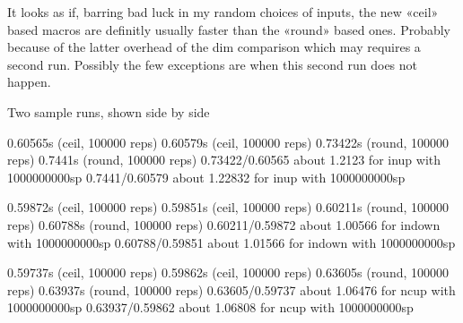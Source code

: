 

%







\bye

It looks as if, barring bad luck in my random choices of inputs,
the new «ceil» based macros are definitly usually faster than
the «round» based ones. Probably because of the latter
overhead of the dim comparison which may requires a second run.
Possibly the few exceptions are when this second run does not
happen.

Two sample runs, shown side by side

0.60565s (ceil, 100000 reps)                               0.60579s (ceil, 100000 reps)                              
0.73422s (round, 100000 reps)                              0.7441s (round, 100000 reps)                              
0.73422/0.60565 about 1.2123 for inup with 1000000000sp    0.7441/0.60579 about 1.22832 for inup with 1000000000sp   
                                                                                                                     
0.59872s (ceil, 100000 reps)                               0.59851s (ceil, 100000 reps)                              
0.60211s (round, 100000 reps)                              0.60788s (round, 100000 reps)                             
0.60211/0.59872 about 1.00566 for indown with 1000000000sp 0.60788/0.59851 about 1.01566 for indown with 1000000000sp
                                                                                                                     
0.59737s (ceil, 100000 reps)                               0.59862s (ceil, 100000 reps)                              
0.63605s (round, 100000 reps)                              0.63937s (round, 100000 reps)                             
0.63605/0.59737 about 1.06476 for ncup with 1000000000sp   0.63937/0.59862 about 1.06808 for ncup with 1000000000sp  
                                                                                                                     
